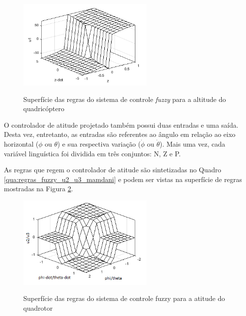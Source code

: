 

\begin{figure}[!htb]
    \centering
    \caption{Superfície das regras do sistema de controle \textit{fuzzy} para a altitude do quadricóptero}
    \includegraphics[width=0.6\textwidth]{./04-figuras/resultados/fis_u1/u1_mamdani_surface}
    \label{fig:1_mamdani_surface}
\end{figure}

O controlador de atitude projetado também possui duas entradas e uma saída. Desta vez, entretanto, as entradas são referentes ao ângulo em relação ao eixo horizontal ($\phi$ ou $\theta$) e sua respectiva variação ($\dot{\phi}$ ou $\dot{\theta}$). Mais uma vez, cada variável linguística foi dividida em três conjuntos: N, Z e P.

As regras que regem o controlador de atitude são sintetizadas no Quadro \ref{qua:regras_fuzzy_u2_u3_mamdani} e podem ser vistas na superfície de regras mostradas na Figura \ref{fig:u2_u3_mamdani_surface}.



\begin{figure}[!htb]
    \centering
    \caption{Superfície das regras do sistema de controle fuzzy para a atitude do quadrotor}
    \includegraphics[width=0.6\textwidth]{./04-figuras/resultados/fis_u2/u2_u3_mamdani_surface}
    \label{fig:u2_u3_mamdani_surface}
\end{figure}

